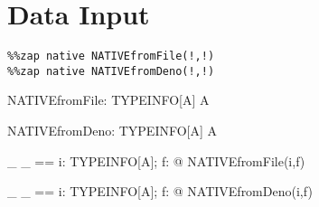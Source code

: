 \documentclass{article}
\begin{document}
\section{Data Input}


\begin{verbatim}
%%zap native NATIVEfromFile(!,!) 
%%zap native NATIVEfromDeno(!,!) 
\end{verbatim}

\begin{axdef}[A]
  NATIVEfromFile: \assumed TYPEINFO[A] \cross \denotation \fun \seq A
\end{axdef}

\begin{axdef}[A]
  NATIVEfromDeno: \assumed TYPEINFO[A] \cross \denotation \fun \seq A
\end{axdef}


\begin{axdef}[A]
  \_ \fromfile \_ == \lambda i: TYPEINFO[A]; f: \denotation @ NATIVEfromFile(i,f)
\end{axdef}

\begin{axdef}[A]
  \_ \fromdeno \_ == \lambda i: TYPEINFO[A]; f: \denotation @ NATIVEfromDeno(i,f)
\end{axdef}
\end{document}

